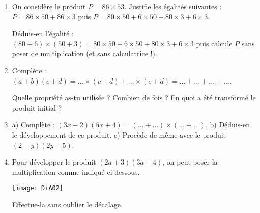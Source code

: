 




\begin{activite}[Développer $(a + b)(c + d)$]
\begin{enumerate}
    \item On considère le produit $P = 86 \times 53$. Justifie les égalités suivantes : $P = 86 \times 50 + 86 \times 3$ puis $P = 80 \times 50 + 6 \times 50 + 80 \times 3 + 6 \times 3$.

Déduis-en l'égalité : $(80 + 6) \times (50 + 3) = 80 \times 50 + 6 \times 50 + 80 \times 3 + 6 \times 3$ puis calcule $P$ sans poser de multiplication (et sans calculatrice !).
    \item Complète : $(a + b)(c + d) = ... \times (c + d) + ... \times (c + d) = ... + ... + ... + ...$.
    
Quelle propriété as-tu utilisée ? Combien de fois ? En quoi a été transformé le produit initial ?
    \item \subitem a) Complète : $(3x  - 2)(5x + 4) = (... + ...) \times (... + ...)$.
    \subitem b) Déduis-en le développement de ce produit.
    \subitem c) Procède de même avec le produit $(2  - y)(2y  - 5)$.
    \item Pour développer le produit $(2a + 3)(3a  - 4)$, on peut poser la multiplication comme indiqué ci-dessous.
    
    \begin{center}
        \texttt{[image: DiA02]}
    \end{center}
    
    Effectue-la sans oublier le décalage.
\end{enumerate}
\end{activite}
